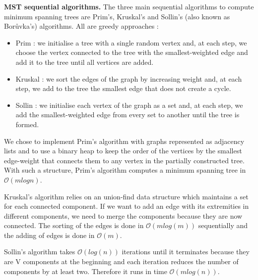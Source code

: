 \documentclass[letterpaper]{article}
\newcommand{\mypar}[1]{{\bf #1.}}
\begin{document}
\mypar{MST sequential algorithms} The three main sequential algorithms to compute minimum spanning trees are Prim's, Kruskal's and Sollin's (also known as Borůvka's)  algorithms. All are greedy approaches :
\begin{itemize}
    \item Prim : we initialise a tree with a single random vertex and, at each step, we choose the vertex connected to the tree with the smallest-weighted edge and add it to the tree until all vertices are added.
    \item Kruskal : we sort the edges of the graph by increasing weight and, at each step, we add to the tree the smallest edge that does not create a cycle.
    \item Sollin : we initialise each vertex of the graph as a set and, at each step, we add the smallest-weighted edge from every set to another until the tree is formed.
\end{itemize}

We chose to implement Prim's algorithm with graphs represented as adjacency lists and to use a binary heap to keep the order of the vertices by the smallest edge-weight that connects them to any vertex in the partially constructed tree. With such a structure, Prim's algorithm computes a minimum spanning tree in $\mathcal{O}(mlogn)$.

Kruskal's algorithm relies on an union-find data structure which maintains a set for each connected component. If we want to add an edge with its extremities in different components, we need to merge the components because they are now connected. The sorting of the edges is done in $\mathcal{O}(mlog(m))$ sequentially and the adding of edges is done in $\mathcal{O}(m)$.

Sollin's algorithm takes $\mathcal{O}(log(n))$ iterations until it terminates because they are V components at the beginning and each iteration reduces the number of components by at least two. Therefore it runs in time $\mathcal{O}(mlog(n))$.
\end{document}
